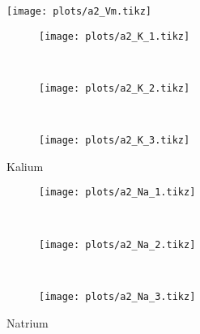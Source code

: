 \documentclass[12pt,a4paper,noendnumber=true]{scrartcl}
\begin{document}
\begin{figure}[H]
	\centering
	\texttt{[image: plots/a2\_Vm.tikz]}
\end{figure}

\newpage

\begin{figure}[H]
	\begin{subfigure}[t]{\textwidth}
		\centering
		\texttt{[image: plots/a2\_K\_1.tikz]}
	\end{subfigure}
	\\
	\begin{subfigure}[t]{\textwidth}
		\centering
		\texttt{[image: plots/a2\_K\_2.tikz]}
	\end{subfigure}
	\\
	\begin{subfigure}[t]{\textwidth}
		\centering
		\texttt{[image: plots/a2\_K\_3.tikz]}
	\end{subfigure}
	\caption{Kalium}
\end{figure}

\begin{figure}[H]
	\begin{subfigure}[t]{\textwidth}
		\centering
		\texttt{[image: plots/a2\_Na\_1.tikz]}
	\end{subfigure}
	\\
	\begin{subfigure}[t]{\textwidth}
		\centering
		\texttt{[image: plots/a2\_Na\_2.tikz]}
	\end{subfigure}
	\\
	\begin{subfigure}[t]{\textwidth}
		\centering
		\texttt{[image: plots/a2\_Na\_3.tikz]}
	\end{subfigure}
	\caption{Natrium}
\end{figure}
\end{document}

